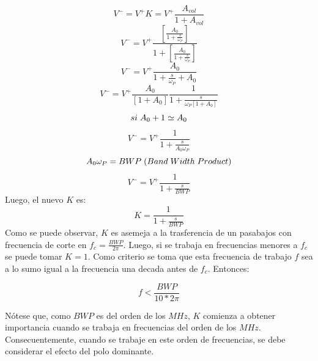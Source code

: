 \documentclass[12pt,a4paper]{article}
\begin{document}
\begin{displaymath} V^- = V^+ K = V^+\frac{A_{vol}}{1+A_{vol}} \end{displaymath}  
\begin{displaymath} V^- = V^+\frac{[\frac{A_{0}}{1+\frac{s}{\omega_P}}]}{1+[\frac{A_{0}}{1+\frac{s}{\omega_P}}]} \end{displaymath}  
\begin{displaymath} V^- = V^+ \frac{A_0}{1+ \frac{s}{\omega_P} + A_0} \end{displaymath}  
\begin{displaymath} V^- = V^+ \frac{A_0}{[1+ A_0]} \frac{1}{1+ \frac{s}{\omega_P [1 + A_0]}} \end{displaymath}  
\begin{displaymath} si \hspace{1mm} A_0 + 1 \simeq A_0 \end{displaymath}  
\begin{displaymath} V^- = V^+ \frac{1}{1 + \frac{s}{A_0 \omega_P}}  \end{displaymath}  
\begin{displaymath} A_0 \omega_P = BWP \hspace{1mm}(Band\hspace{1mm}Width\hspace{1mm}Product) \end{displaymath}  
\begin{displaymath} V^- = V^+ \frac{1}{1 + \frac{s}{BWP}}  \end{displaymath}  
Luego, el nuevo $K$ es:
\begin{displaymath} K = \frac{1}{1 + \frac{s}{BWP}}  \end{displaymath}  
Como se puede observar, $K$ es asemeja a la trasferencia de un pasabajos con frecuencia de corte en $f_c = \frac{BWP}{2\pi}$. Luego, si se trabaja en frecuencias menores a $f_c$ se puede tomar $K=1$. Como criterio se toma que esta frecuencia de trabajo $f$ sea 
a lo sumo igual a la frecuencia una decada antes de $f_c$. Entonces:

\begin{equation} f < \frac{BWP}{10 *2\pi} \label{ej2_ecua_condicion_1}\end{equation}

Nótese que, como $BWP$ es del orden de los $MHz$, $K$ comienza a obtener importancia cuando se trabaja en frecuencias del orden de los $MHz$. Consecuentemente, cuando se trabaje en este orden de frecuencias, se debe considerar el efecto del polo dominante.  
\end{document}
